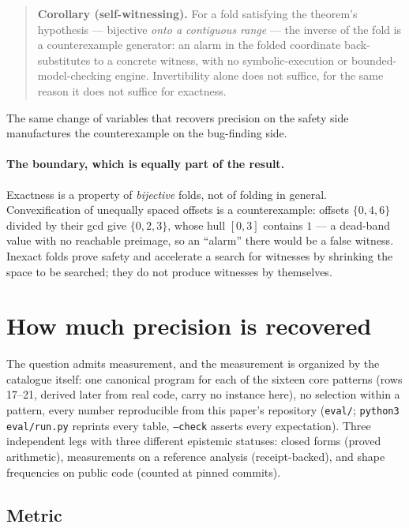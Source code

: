 \documentclass[11pt,a4paper]{article}
\begin{document}
\begin{quote}
\textbf{Corollary (self-witnessing).} For a fold satisfying the theorem's hypothesis ---
bijective \emph{onto a contiguous range} --- the inverse of the fold is a counterexample
generator: an alarm in the folded coordinate back-substitutes to a concrete witness, with
no symbolic-execution or bounded-model-checking engine. Invertibility alone does not
suffice, for the same reason it does not suffice for exactness.
\end{quote}

\noindent
The same change of variables that recovers precision on the safety side manufactures the
counterexample on the bug-finding side.

\paragraph{The boundary, which is equally part of the result.} Exactness is a property of
\emph{bijective} folds, not of folding in general. Convexification of unequally spaced
offsets is a counterexample: offsets $\{0,4,6\}$ divided by their gcd give $\{0,2,3\}$,
whose hull $[0,3]$ contains $1$ --- a dead-band value with no reachable preimage, so an
``alarm'' there would be a false witness. Inexact folds prove safety and accelerate a
search for witnesses by shrinking the space to be searched; they do not produce witnesses
by themselves.

\section{How much precision is recovered}
\label{sec:eval}

The question admits measurement, and the measurement is organized by the catalogue
itself: one canonical program for each of the sixteen core patterns (rows 17--21, derived
later from real code, carry no instance here), no selection within a pattern, every
number reproducible from this paper's repository (\texttt{eval/}; \texttt{python3 eval/run.py}
reprints every table, \texttt{--check} asserts every expectation). Three independent
legs with three different epistemic statuses: closed forms (proved arithmetic),
measurements on a reference analysis (receipt-backed), and shape frequencies on public
code (counted at pinned commits).

\subsection{Metric}
\end{document}
